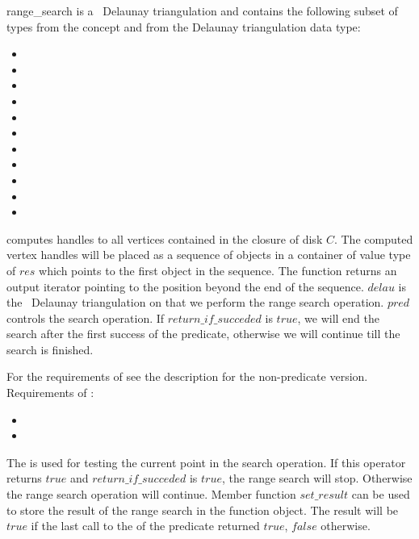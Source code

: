 \begin{ccRefFunction}{range_search}
 is a \cgal\ Delaunay triangulation and contains the following subset of types from the concept  and from
the Delaunay triangulation data type:
\begin{itemize}
  \item {} 
  \item {}
  \item {} 
  \item {}   
  \item {} 
  \item {}  
  \item {}  
  \item {} 
  \item {} 
  \item {} 
  \item {}  
\end{itemize}


{ computes handles to all vertices contained in the closure of disk $C$.
The computed vertex handles will be placed as a sequence of objects in a container of value type
of $res$
which points to the first object in the sequence. The function
returns an output iterator pointing to the position beyond the end
of the sequence.
$delau$ is the \cgal\ Delaunay triangulation on that we perform the range search operation.
$pred$ controls the search operation. If $return\_if\_succeded$ is $true$, we will end the search
after the first success of the predicate, otherwise we will continue till the search is finished.}

For the requirements of  see the description for the non-predicate version.\\
Requirements of :
\begin{itemize}
  \item {}
  \item {}
\end{itemize}
The  is used for testing the current point in the search operation.
If this operator returns $true$ and $return\_if\_succeded$ is $true$, the range search will stop.
Otherwise the range search operation will continue. Member function  $set\_result$ can be used to
store the result of the range search in the function object. The result will be $true$ if the last
call to the   of the predicate returned $true$, $false$ otherwise.


\end{ccRefFunction}
